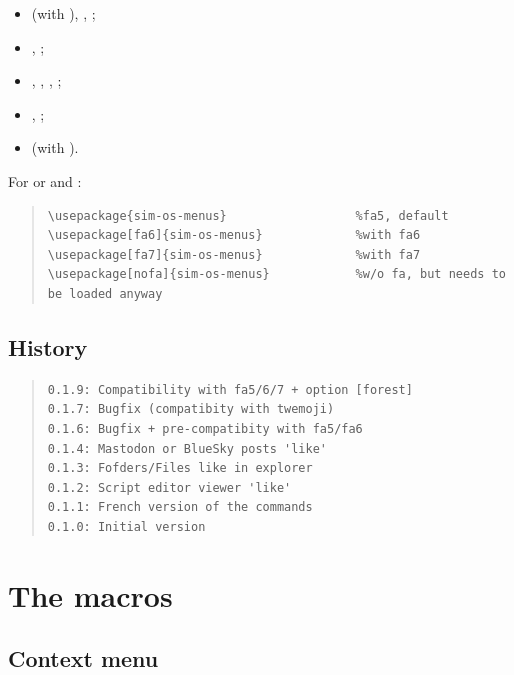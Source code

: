 \documentclass[11pt,a4paper]{ltxdoc}
\begin{document}
\begin{itemize}
	\item {} (with ), , ;
	\item {}, ;
	\item {}, , , ;
	\item {}, ;
	\item {} (with ).
\end{itemize}

For  or  and  :

\begin{quote}
\begin{verbatim}
\usepackage{sim-os-menus}                  %fa5, default
\usepackage[fa6]{sim-os-menus}             %with fa6
\usepackage[fa7]{sim-os-menus}             %with fa7
\usepackage[nofa]{sim-os-menus}            %w/o fa, but needs to be loaded anyway
\end{verbatim}
\end{quote}

\vfill

\subsection{History}

\begin{quote}
\begin{verbatim}
0.1.9: Compatibility with fa5/6/7 + option [forest]
0.1.7: Bugfix (compatibity with twemoji)
0.1.6: Bugfix + pre-compatibity with fa5/fa6
0.1.4: Mastodon or BlueSky posts 'like'
0.1.3: Fofders/Files like in explorer
0.1.2: Script editor viewer 'like'
0.1.1: French version of the commands
0.1.0: Initial version
\end{verbatim}
\end{quote}

\pagebreak

\section{The macros}

\subsection{Context menu}
\end{document}
